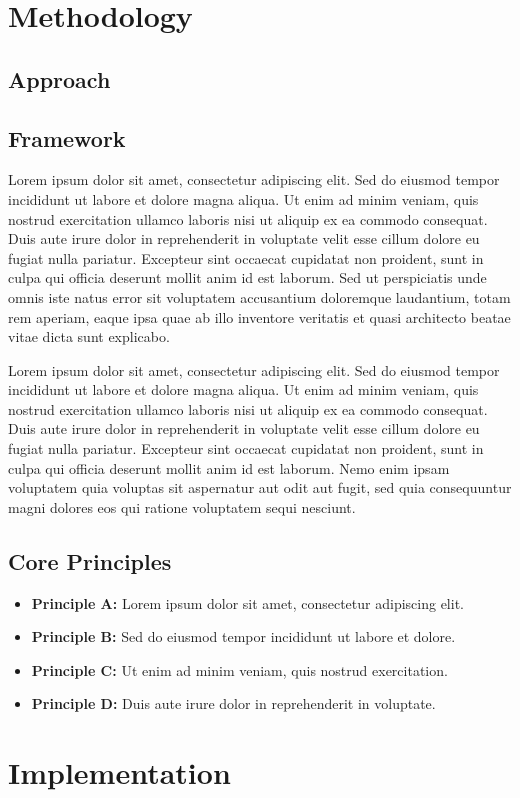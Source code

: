 \documentclass[11pt,a4paper]{article}
\newcommand{\loremtext}[1]{%
  Lorem ipsum dolor sit amet, consectetur adipiscing elit. Sed do eiusmod tempor incididunt ut labore et dolore magna aliqua. Ut enim ad minim veniam, quis nostrud exercitation ullamco laboris nisi ut aliquip ex ea commodo consequat. Duis aute irure dolor in reprehenderit in voluptate velit esse cillum dolore eu fugiat nulla pariatur. Excepteur sint occaecat cupidatat non proident, sunt in culpa qui officia deserunt mollit anim id est laborum.%
}
\begin{document}
\section{Methodology}

\subsection{Approach}

\begin{center}
\end{center}

\subsection{Framework}

\loremtext{6} Sed ut perspiciatis unde omnis iste natus error sit voluptatem accusantium doloremque laudantium, totam rem aperiam, eaque ipsa quae ab illo inventore veritatis et quasi architecto beatae vitae dicta sunt explicabo.

\loremtext{7} Nemo enim ipsam voluptatem quia voluptas sit aspernatur aut odit aut fugit, sed quia consequuntur magni dolores eos qui ratione voluptatem sequi nesciunt.

\subsection{Core Principles}

\begin{itemize}
  \item \textbf{Principle A:} Lorem ipsum dolor sit amet, consectetur adipiscing elit.
  \item \textbf{Principle B:} Sed do eiusmod tempor incididunt ut labore et dolore.
  \item \textbf{Principle C:} Ut enim ad minim veniam, quis nostrud exercitation.
  \item \textbf{Principle D:} Duis aute irure dolor in reprehenderit in voluptate.
\end{itemize}

\section{Implementation}
\end{document}
